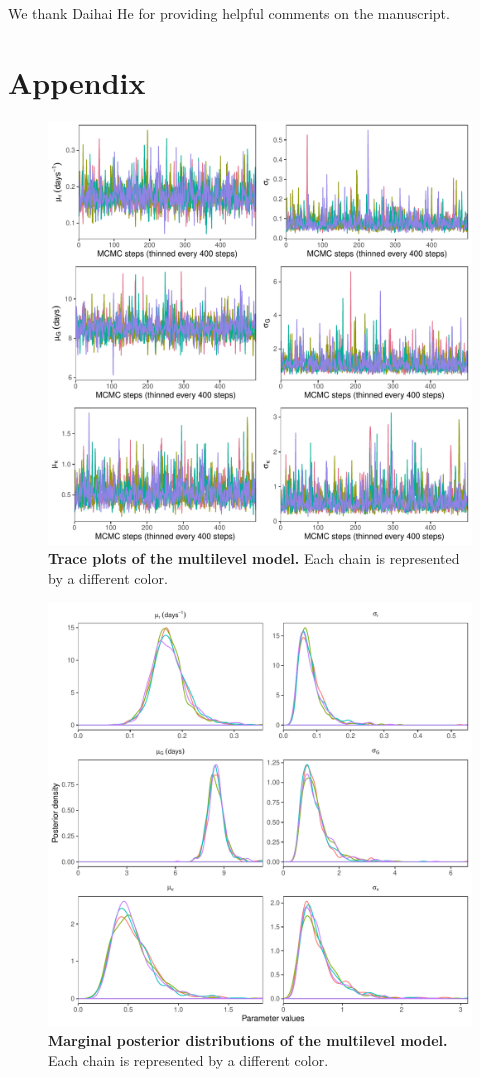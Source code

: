 \documentclass[12pt]{article}
\begin{document}
We thank Daihai He for providing helpful comments on the manuscript.

\pagebreak



\pagebreak
\appendix
\renewcommand\thefigure{A\arabic{figure}}
\setcounter{figure}{0}    
\section*{Appendix}

\begin{figure}[!h]
\includegraphics[width=\textwidth]{posterior_chain.pdf}
\caption{
\textbf{Trace plots of the multilevel model.}
Each chain is represented by a different color.
}
\end{figure}

\pagebreak

\begin{figure}[!h]
\includegraphics[width=\textwidth]{posterior_dist.pdf}
\caption{
\textbf{Marginal posterior distributions of the multilevel model.}
Each chain is represented by a different color.
}
\end{figure}
\end{document}
